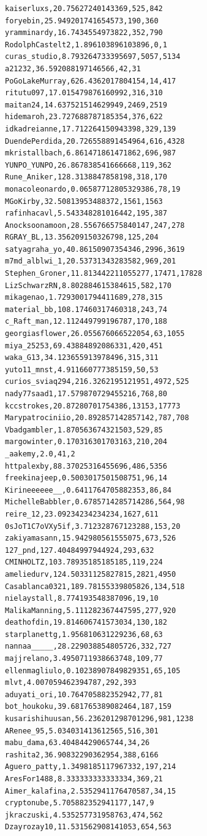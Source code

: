 \begin{verbatim}
kaiserluxs,20.75627240143369,525,842
foryebin,25.949201741654573,190,360
yramminardy,16.7434554973822,352,790
RodolphCastelt2,1.896103896103896,0,1
curas_studio,8.793264733395697,5057,5134
a21232,36.592088197146566,42,31
PoGoLakeMurray,626.4362017804154,14,417
ritutu097,17.015479876160992,316,310
maitan24,14.637521514629949,2469,2519
hidemaroh,23.727688787185354,376,622
idkadreianne,17.712264150943398,329,139
DuendePerdida,20.726558891454964,616,4328
mkristallbach,6.861471861471862,696,987
YUNPO_YUNPO,26.867838541666668,119,362
Rune_Aniker,128.3138847858198,318,170
monacoleonardo,0.06587712805329386,78,19
MGoKirby,32.50813953488372,1561,1563
rafinhacavl,5.543348281016442,195,387
Anocksoonamoon,28.556766575840147,247,278
RGRAY_BL,13.356209150326798,125,204
satyagraha_yo,40.86150907354346,2996,3619
m7md_alblwi_1,20.53731343283582,969,201
Stephen_Groner,11.813442211055277,17471,17828
LizSchwarzRN,8.802884615384615,582,170
mikagenao,1.7293001794411689,278,315
material_bb,108.17460317460318,243,74
c_Raft_man,12.112449799196787,170,188
georgiasflower,26.055676066522054,63,1055
miya_25253,69.43884892086331,420,451
waka_G13,34.123655913978496,315,311
yuto11_mnst,4.911660777385159,50,53
curios_sviaq294,216.3262195121951,4972,525
nady77saad1,17.579870729455216,768,80
kccstrokes,20.87280701754386,13153,17773
Marypatrociniio,20.892857142857142,787,708
Vbadgambler,1.870563674321503,529,85
margowinter,0.170316301703163,210,204
_aakemy,2.0,41,2
httpalexby,88.37025316455696,486,5356
freekinajeep,0.5003017501508751,96,14
Kirineeeeee__,0.6411764705882353,86,84
MichelleBabbler,0.6785714285714286,564,98
reire_12,23.09234234234234,1627,611
0sJoT1C7oVXy5if,3.712328767123288,153,20
zakiyamasann,15.942980561555075,673,526
127_pnd,127.40484997944924,293,632
CMINHOLTZ,103.78935185185185,119,224
ameliedurv,124.50331125827815,2821,4950
Casablanca0321,189.78155339805826,134,518
nielaystall,8.774193548387096,19,10
MalikaManning,5.111282367447595,277,920
deathofdin,19.814606741573034,130,182
starplanettg,1.956810631229236,68,63
nannaa_____,28.229038854805726,332,727
majjrelano,3.4950711938663748,109,77
ellenmagliulo,0.10238907849829351,65,105
mlvt,4.007059462394787,292,393
aduyati_ori,10.764705882352942,77,81
bot_houkoku,39.681765389082464,187,159
kusarishihuusan,56.236201298701296,981,1238
ARenee_95,5.034031413612565,516,301
mabu_dama,63.40484429065744,34,26
rashita2,36.90832290362954,388,6166
Aguero_patty,1.3498185117967332,197,214
AresFor1488,8.333333333333334,369,21
Aimer_kalafina,2.5352941176470587,34,15
cryptonube,5.705882352941177,147,9
jkraczuski,4.535257731958763,474,562
Dzayrozay10,11.531562908141053,654,563

\end{verbatim}
